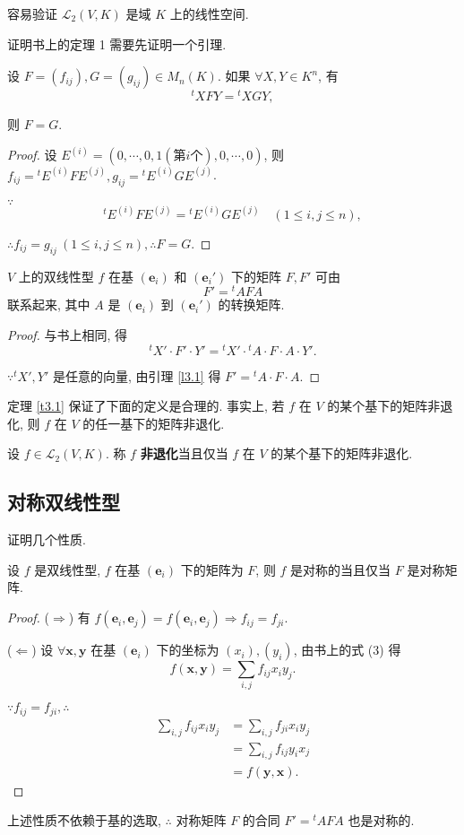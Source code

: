 \documentclass[color=black,device=normal,lang=cn,mode=geye]{elegantnote}
\begin{document}
容易验证 $\mathcal{L}_2(V,K)$ 是域 $K$ 上的线性空间.


证明书上的定理 1 需要先证明一个引理.
\begin{lemma}\label{l3.1}
    设 $F=(f_{ij}),G=(g_{ij})\in M_n(K)$. 如果 $\forall X,Y\in K^n$, 有
    \[{}^tXFY={}^tXGY,\]

    则 $F=G$.
\end{lemma}
\begin{proof}
    设 $E^{(i)}=(0,\cdots,0,1(\text{第}i\text{个}),0,\cdots,0)$, 则 $f_{ij}={}^tE^{(i)}FE^{(j)},g_{ij}={}^tE^{(i)}GE^{(j)}$.

    $\because$
    \[{}^tE^{(i)}FE^{(j)}={}^tE^{(i)}GE^{(j)}\quad(1\leq i,j\leq n),\]

    $\therefore f_{ij}=g_{ij}\ (1\leq i,j\leq n),\therefore F=G$.
\end{proof}
\begin{theorem}[书上的定理 1]\label{t3.1}
    $V$ 上的双线性型 $f$ 在基 $(\boldsymbol{e}_i)$ 和 $(\boldsymbol{e}_i')$ 下的矩阵 $F,F'$ 可由
    \[F'={}^tAFA\]
    联系起来, 其中 $A$ 是 $(\boldsymbol{e}_i)$ 到 $(\boldsymbol{e}_i')$ 的转换矩阵.
\end{theorem}
\begin{proof}
    与书上相同, 得
    \[{}^tX'\cdot F'\cdot Y'={}^tX'\cdot{}^tA\cdot F\cdot A\cdot Y'.\]

    $\because{}^tX',Y'$ 是任意的向量, 由引理 \ref{l3.1} 得 $F'={}^tA\cdot F\cdot A$.
\end{proof}
定理 \ref{t3.1} 保证了下面的定义是合理的. 事实上, 若 $f$ 在 $V$ 的某个基下的矩阵非退化, 则 $f$ 在 $V$ 的任一基下的矩阵非退化.
\begin{definition}
    设 $f\in\mathcal{L}_2(V,K)$. 称 $f$ \textbf{非退化}当且仅当 $f$ 在 $V$ 的某个基下的矩阵非退化.
\end{definition}
\subsection{对称双线性型}
证明几个性质.
\begin{property}\label{p3.1}
    设 $f$ 是双线性型, $f$ 在基 $(\boldsymbol{e}_i)$ 下的矩阵为 $F$, 则 $f$ 是对称的当且仅当 $F$ 是对称矩阵.
\end{property}
\begin{proof}
    ($\Rightarrow$) 有 $f(\boldsymbol{e}_i,\boldsymbol{e}_j)=f(\boldsymbol{e}_i,\boldsymbol{e}_j)\Rightarrow f_{ij}=f_{ji}$.

    ($\Leftarrow$) 设 $\forall\boldsymbol{x},\boldsymbol{y}$ 在基 $(\boldsymbol{e}_i)$ 下的坐标为 $(x_i),(y_i)$, 由书上的式 (3) 得
    \[f(\boldsymbol{x},\boldsymbol{y})=\sum\limits_{i,j}f_{ij}x_iy_j.\]

    $\because f_{ij}=f_{ji},\therefore$
    \begin{align*}
        \sum\limits_{i,j}f_{ij}x_iy_j & =\sum\limits_{i,j}f_{ji}x_iy_j \\
        & =\sum\limits_{i,j}f_{ij}y_ix_j \\
        & =f(\boldsymbol{y},\boldsymbol{x}).
    \end{align*}
\end{proof}
上述性质不依赖于基的选取, $\therefore$ 对称矩阵 $F$ 的合同 $F'={}^tAFA$ 也是对称的.
\end{document}

